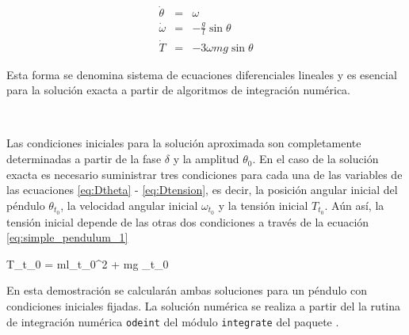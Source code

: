 \begin{eqnarray}
\label{eq:Dtheta}
\dot \theta &=& \omega \\
\label{eq:Domega}
\dot \omega &=& -\frac{g}{l}\sin \theta \\
\label{eq:Dtension}
\dot T &=& -3\omega mg\sin \theta
\end{eqnarray}


Esta forma se denomina sistema de ecuaciones diferenciales lineales y es 
esencial para la solución exacta a partir de algoritmos de integración 
numérica.

\

Las condiciones iniciales para la solución aproximada son completamente 
determinadas a partir de la fase $\delta$ y la amplitud $\theta_0$. En el 
caso de la solución exacta es necesario suministrar tres condiciones para
cada una de las variables de las ecuaciones \ref{eq:Dtheta} - 
\ref{eq:Dtension}, es decir, la posición angular inicial del péndulo 
$\theta_{t_0}$, la velocidad angular inicial $\omega_{t_0}$ y la tensión
inicial $T_{t_0}$. Aún así, la tensión inicial depende de las otras dos 
condiciones a través de la ecuación \ref{eq:simple_pendulum_1}


{T_{t_0} = ml\omega_{t_0}^2 + mg \cos \theta_{t_0}}


En esta demostración se calcularán ambas soluciones para un péndulo con 
condiciones iniciales fijadas. La solución numérica se realiza a partir del
la rutina de integración numérica \texttt{odeint} del módulo \texttt{integrate}
del paquete \scipy.


